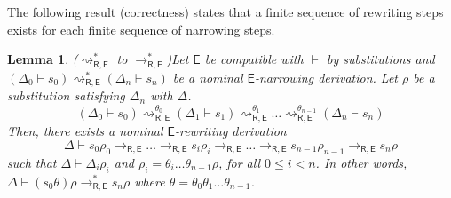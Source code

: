 \documentclass[submission,copyright,creativecommons]{eptcs}
\newcommand{\theory}[1]{\ensuremath{\mathsf{#1}}}
\theoremstyle{plain}
\newtheorem{lemma}[theorem]{Lemma}
\theoremstyle{definition}
\theoremstyle{remark}
\begin{document}
The following result (correctness) states that a finite sequence of rewriting steps exists for each finite sequence of narrowing steps.


\begin{lemma}{($\rightsquigarrow_{\theory{R,E}}^*$ to $\to_{\theory{R,E}}^*$)}\label{theo:narrowtorewrite}
Let \theory{E} be compatible with $\vdash$ by substitutions and  $(\Delta_0\vdash s_0) \rightsquigarrow^*_{\theory{R,E}} (\Delta_n \vdash s_n) $ be a nominal \theory{E}-narrowing derivation. 
Let $\rho$ be a substitution satisfying $\Delta_n$ with  $\Delta$.
$$(\Delta_0\vdash s_0) \rightsquigarrow^{\theta_0}_{\theory{R,E}} (\Delta_1 \vdash s_1) \rightsquigarrow^{\theta_1}_{\theory{R,E}}  \ldots \rightsquigarrow^{\theta_{n-1}}_{\theory{R,E}} (\Delta_n \vdash s_n) $$
Then, there exists a nominal \theory{E}-rewriting derivation 
$$\Delta\vdash s_0\rho_0  \rightarrow_{\theory{R,E}} \ldots \rightarrow_{\theory{R,E}} s_i\rho_i \rightarrow_{\theory{R,E}}\ldots   \rightarrow_{\theory{R,E}} s_{n-1}\rho_{n-1}\rightarrow_{\theory{R,E}} s_n\rho$$ 
such that $\Delta\vdash \Delta_i\rho_{i}$ and $\rho_{i}=\theta_{i}\ldots \theta_{n-1}\rho$, for all $0\leq i < n$. In other words,
$\Delta\vdash (s_0 \theta )\rho \rightarrow^*_{\theory{R,E}}  s_n \rho $
where $\theta=\theta_0\theta_1\ldots \theta_{n-1}$.
\end{lemma}
\end{document}
